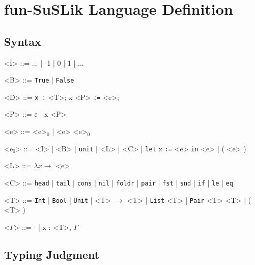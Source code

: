 \documentclass[10pt]{article}
\newcommand{\ttt}[1]{\texttt{#1}}
\newcommand{\ra}{\ensuremath{\rightarrow}}
\newcommand{\head}{\ttt{head}}
\newcommand{\tail}{\ttt{tail}}
\newcommand{\cons}{\ttt{cons}}
\newcommand{\nil}{\ttt{nil}}
\newcommand{\foldr}{\ttt{foldr}}
\newcommand{\pair}{\ttt{pair}}
\newcommand{\fst}{\ttt{fst}}
\newcommand{\snd}{\ttt{snd}}
\newcommand{\ite}{\ttt{if}}
\newcommand{\letbnd}{\ttt{let}}
\newcommand{\inexpr}{\ttt{in}}
\newcommand{\lesseq}{\ttt{le}}
\newcommand{\eq}{\ttt{eq}}
\begin{document}
\section{fun-SuSLik Language Definition}
\subsection{Syntax}

\begin{grammar}
  <I> ::= ... | -1 | 0 | 1 | ...

  <B> ::= \ttt{True} | \ttt{False}

  <D> ::= \ttt{x :} <T>; x <P> \ttt{:=} <e>;

  <P> ::= $\varepsilon$ | x <P>

  <e> ::= <e>$_0$ | <e> <e>$_0$

  <e$_0$> ::= <I> | <B> | \ttt{unit} | <L> | <C> | \letbnd\; x \ttt{:=} <e> \inexpr\; <e> | ( <e> )

  <L> ::= $\lambda x \ra$ <e>

  <C> ::= \head\; | \tail\; | \cons\; | \nil\; | \foldr\; | \pair\; | \fst\; | \snd\; | \ite\; | \lesseq\; | \eq

  <T> ::= \ttt{Int} | \ttt{Bool} | \ttt{Unit} | <T> $\ra$ <T> | \ttt{List} <T> | \ttt{Pair} <T> <T> | ( <T> )

  <$\Gamma$> ::= $\cdot$ | x : <T>, $\Gamma$
\end{grammar}

\subsection{Typing Judgment}
\end{document}

